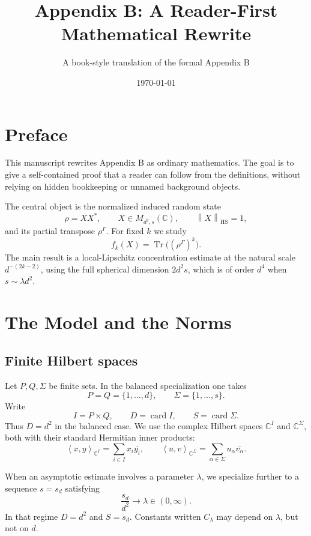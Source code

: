 \documentclass[11pt,oneside]{book}
\title{Appendix B: A Reader-First Mathematical Rewrite}
\author{A book-style translation of the formal Appendix B}
\date{\today}
\DeclareMathOperator{\Tr}{Tr}
\DeclareMathOperator{\card}{card}
\newcommand{\C}{\mathbb C}
\newcommand{\1}{\mathbf 1}
\newcommand{\GammaPT}{\Gamma}
\newcommand{\HS}{\mathrm{HS}}
\newcommand{\norm}[1]{\left\|#1\right\|}
\newcommand{\ip}[2]{\left\langle #1,#2\right\rangle}
\begin{document}
\frontmatter
\maketitle

\chapter*{Preface}

This manuscript rewrites Appendix B as ordinary mathematics.  The goal is to
give a self-contained proof that a reader can follow from the definitions,
without relying on hidden bookkeeping or unnamed background objects.

The central object is the normalized induced random state
\[
  \rho=XX^*,\qquad X\in M_{d^2,s}(\C),\qquad \norm{X}_{\HS}=1,
\]
and its partial transpose \(\rho^{\GammaPT}\).  For fixed \(k\) we study
\[
  f_k(X)=\Tr\bigl((\rho^{\GammaPT})^k\bigr).
\]
The main result is a local-Lipschitz concentration estimate at the natural
scale \(d^{-(2k-2)}\), using the full spherical dimension \(2d^2s\), which is
of order \(d^4\) when \(s\sim\lambda d^2\).

\tableofcontents

\mainmatter

\chapter{The Model and the Norms}

\section{Finite Hilbert spaces}

Let \(P,Q,\Sigma\) be finite sets.  In the balanced specialization one takes
\[
  P=Q=\{1,\ldots,d\},\qquad \Sigma=\{1,\ldots,s\}.
\]
Write
\[
  I=P\times Q,\qquad D=\card I,\qquad S=\card \Sigma .
\]
Thus \(D=d^2\) in the balanced case.  We use the complex Hilbert spaces
\(\C^I\) and \(\C^\Sigma\), both with their standard Hermitian inner products:
\[
  \ip{x}{y}_{\C^I}=\sum_{i\in I}x_i\overline{y_i},
  \qquad
  \ip{u}{v}_{\C^\Sigma}=\sum_{\alpha\in\Sigma}u_\alpha\overline{v_\alpha}.
\]

When an asymptotic estimate involves a parameter \(\lambda\), we specialize
further to a sequence \(s=s_d\) satisfying
\[
  \frac{s_d}{d^2}\longrightarrow \lambda\in(0,\infty).
\]
In that regime \(D=d^2\) and \(S=s_d\).  Constants written \(C_\lambda\) may
depend on \(\lambda\), but not on \(d\).
\end{document}
